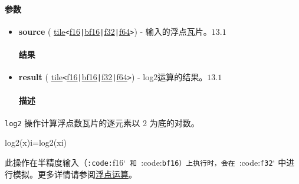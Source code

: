 \documentclass{article}
\begin{document}
\paragraph{参数}


\begin{itemize}
\item \textbf{source} ( \href{https://docs.nvidia.com/cuda/tile-ir/latest/sections/types.html#type-tile}{tile}\texttt{<}\href{https://docs.nvidia.com/cuda/tile-ir/latest/sections/types.html#subsection-element-types}{f16}\texttt{|}\href{https://docs.nvidia.com/cuda/tile-ir/latest/sections/types.html#subsection-element-types}{bf16}\texttt{|}\href{https://docs.nvidia.com/cuda/tile-ir/latest/sections/types.html#subsection-element-types}{f32}\texttt{|}\href{https://docs.nvidia.com/cuda/tile-ir/latest/sections/types.html#subsection-element-types}{f64}\texttt{>}) - 输入的浮点瓦片。$\boxed{13.1}$




\paragraph{结果}


\item \textbf{result} ( \href{https://docs.nvidia.com/cuda/tile-ir/latest/sections/types.html#type-tile}{tile}\texttt{<}\href{https://docs.nvidia.com/cuda/tile-ir/latest/sections/types.html#subsection-element-types}{f16}\texttt{|}\href{https://docs.nvidia.com/cuda/tile-ir/latest/sections/types.html#subsection-element-types}{bf16}\texttt{|}\href{https://docs.nvidia.com/cuda/tile-ir/latest/sections/types.html#subsection-element-types}{f32}\texttt{|}\href{https://docs.nvidia.com/cuda/tile-ir/latest/sections/types.html#subsection-element-types}{f64}\texttt{>}) - log2运算的结果。$\boxed{13.1}$




\paragraph{描述}


\end{itemize}
\texttt{log2} 操作计算浮点数瓦片的逐元素以 2 为底的对数。



log2(x)i=log2(xi)


此操作在半精度输入（\texttt{:code:}f16`\texttt{ 和 }:code:\texttt{bf16}\texttt{）上执行时，会在 }:code:\texttt{f32}` 中进行模拟。更多详情请参阅\href{https://docs.nvidia.com/cuda/tile-ir/latest/sections/operations.html#op-group-floating-point}{浮点运算}。
\end{document}
